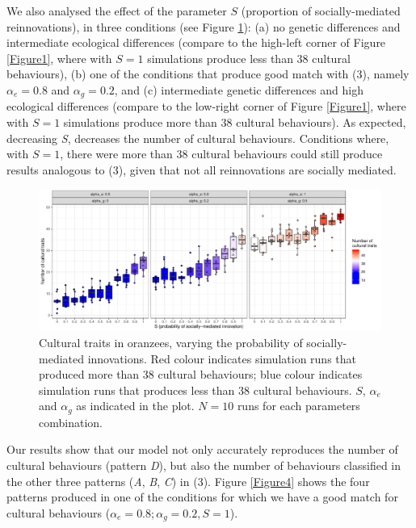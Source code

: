 \documentclass[9pt,twocolumn,twoside,]{pnas-new}
\begin{document}
We also analysed the effect of the parameter \(S\) (proportion of
socially-mediated reinnovations), in three conditions (see Figure
\ref{Figure3}): (a) no genetic differences and intermediate ecological
differences (compare to the high-left corner of Figure \ref{Figure1},
where with \(S=1\) simulations produce less than 38 cultural
behaviours), (b) one of the conditions that produce good match with (3),
namely \(\alpha_e=0.8\) and \(\alpha_g=0.2\), and (c) intermediate
genetic differences and high ecological differences (compare to the
low-right corner of Figure \ref{Figure1}, where with \(S=1\) simulations
produce more than 38 cultural behaviours). As expected, decreasing
\emph{S}, decreases the number of cultural behaviours. Conditions where,
with \(S=1\), there were more than 38 cultural behaviours could still
produce results analogous to (3), given that not all reinnovations are
socially mediated.

\begin{figure}[h!]
\begin{center}
\includegraphics[width=17.8cm]{figures/figure_3.pdf}
\caption{Cultural traits in oranzees, varying the probability of socially-mediated innovations. Red colour indicates simulation runs that produced more than 38 cultural behaviours; blue colour indicates simulation runs that produces less than 38 cultural behaviours. $S$, $\alpha_e$ and $\alpha_g$ as indicated in the plot. $N=10$ runs for each parameters combination.}
\label{Figure3}
\end{center}
\end{figure}

Our results show that our model not only accurately reproduces the
number of cultural behaviours (pattern \emph{D}), but also the number of
behaviours classified in the other three patterns (\emph{A}, \emph{B},
\emph{C}) in (3). Figure \ref{Figure4} shows the four patterns produced
in one of the conditions for which we have a good match for cultural
behaviours (\(\alpha_e=0.8;\alpha_g=0.2, S=1\)).
\end{document}
